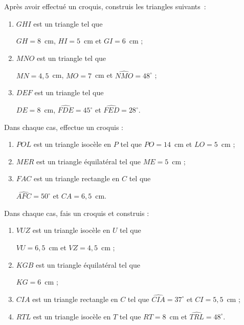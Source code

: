 \begin{exercice}
Après avoir effectué un croquis, construis les triangles suivants :
 \begin{enumerate}
  \item $GHI$ est un triangle tel que 
  
  $GH = 8$ cm, $HI = 5$ cm et $GI = 6$ cm ;
  \item $MNO$ est un triangle tel que 
  
  $MN = 4,5$ cm, $MO = 7$ cm et $\widehat{NMO} = 48^\circ$ ;
  \item $DEF$ est un triangle tel que 
  
  $DE = 8$ cm, $\widehat{FDE} = 45^\circ$ et $\widehat{FED} = 28^\circ$. 
  \end{enumerate}
\end{exercice}


\newpage

\begin{exercice}
Dans chaque cas, effectue un croquis :
 \begin{enumerate}
  \item $POL$ est un triangle isocèle en $P$ tel que $PO = 14$ cm et $LO = 5$ cm ;
  \item $MER$ est un triangle équilatéral tel que $ME = 5$ cm ;
  \item $FAC$ est un triangle rectangle en $C$ tel que 
  
  $\widehat{AFC}= 50^\circ$ et $CA = 6,5$ cm.  
  \end{enumerate}
\end{exercice}


\begin{exercice}
Dans chaque cas, fais un croquis et construis :
 \begin{enumerate}
  \item $VUZ$ est un triangle isocèle en $U$ tel que 
  
  $VU = 6,5$ cm et $VZ = 4,5$ cm ;
  \item $KGB$ est un triangle équilatéral tel que 
  
  $KG = 6$ cm ;
  \item $CIA$ est un triangle rectangle en $C$ tel que $\widehat{CIA} = 37^\circ$ et $CI = 5,5$ cm ;
  \item $RTL$ est un triangle isocèle en $T$ tel que $RT = 8$ cm et $\widehat{TRL} = 48^\circ$.
  \end{enumerate}
\end{exercice}


